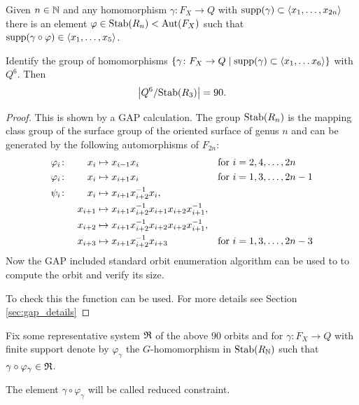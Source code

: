 \documentclass[a4paper,11pt]{amsart}
\begin{document}
\begin{lem}\label{lem:finitelyManyConstraints}
 Given $n\in \mathbb{N}$ and any homomorphism $\gamma\colon F_X \to Q$ with $\textup{supp}(\gamma) \subset \left<x_1,\ldots ,x_{2n}\right>$
 there is an element $\varphi \in \textup{Stab}(R_n)<\textup{Aut}(F_X)$ such that $\textup{supp}(\gamma\circ\varphi) \in \left<x_1,\ldots,x_5\right>$.
\end{lem}
\begin{lem}\label{lem:90Constraints}
 Identify the group of homomorphisms $\{\gamma \colon F_X \to Q \mid \textup{supp}(\gamma) \subset \left<x_1,\ldots x_6\right>\}$ with $Q^6$. 
 Then \[\left|{Q^6/\textup{Stab}(R_3)}\right|=90.\]
\end{lem}
\begin{proof}
 This is shown by a GAP calculation. The group $\textup{Stab}(R_n)$ is the mapping class group
 of the surface group of the oriented surface of genus $n$ and can be generated by the 
 following automorphisms of $F_{2n}$:
 \begin{align*}
  \varphi_i&\colon& x_i&\mapsto x_{i-1}x_i & \textup{for }&i=2,4,\ldots,2n \\
  \varphi_i&\colon&x_i&\mapsto x_{i+1}x_i & \textup{for }&i=1,3,\ldots,2n-1 \\
  \psi_i&\colon&x_i&\mapsto x_{i+1}x_{i+2}^{-1}x_i, && \\  
  &&x_{i+1}&\mapsto x_{i+1}x_{i+2}^{-1}x_{i+1}x_{i+2}x_{i+1}^{-1}, && \\  
  &&x_{i+2}&\mapsto x_{i+1}x_{i+2}^{-1}x_{i+2}x_{i+2}x_{i+1}^{-1}, && \\  
  &&x_{i+3}&\mapsto x_{i+1}x_{i+2}^{-1}x_{i+3}& \textup{for }&i=1,3,\ldots,2n-3   
 \end{align*}
 Now the GAP included standard orbit enumeration algorithm  can be used to 
 to compute the orbit and verify its size. 
 
 To check this the function 
 can be used. For more details see Section \ref{sec:gap_details}
\end{proof}
\begin{defi}
 Fix some representative system $\mathfrak{R}$ of the above $90$ orbits and for 
 $\gamma \colon F_X \to Q$ with finite support denote by $\varphi_\gamma$ the $G$-homomorphism in $\textup{Stab}(R_{\mathbb{N}})$ such that $\gamma\circ \varphi_\gamma \in \mathfrak{R}$.
 
 The element $\gamma \circ \varphi_\gamma$ will be called reduced constraint.
\end{defi}
\end{document}

